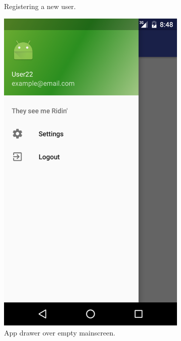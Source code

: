\begin{figure}[ht!]
\begin{subfigure}[b]{0.24\textwidth}
        \caption{Registering a new user.}
        \label{s4tp:newuser}
\end{subfigure}
\begin{subfigure}[b]{0.24\textwidth}
        \includegraphics[width=\textwidth]{figures/s4test/newusermain.png}
        \caption{App drawer over empty mainscreen.}
        \label{s4tp:numain}
    \end{subfigure}
\begin{subfigure}[b]{0.24\textwidth}

\end{subfigure}
\end{figure}
